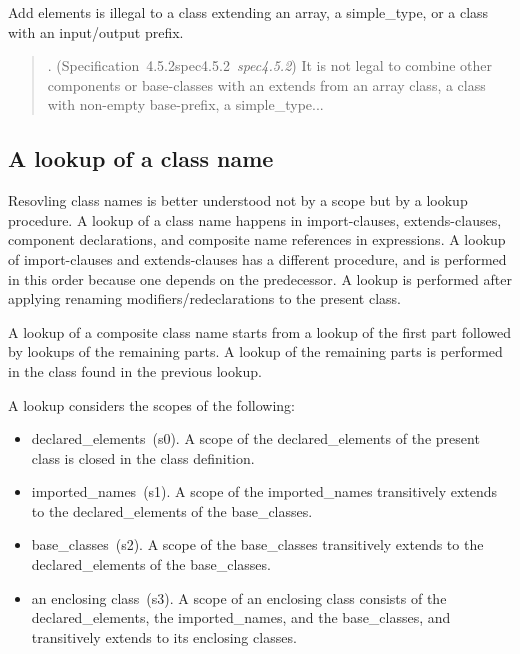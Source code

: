 \documentclass[10pt,b5paper]{article}
\newcounter{quoteno}
\def\quotelead{\refstepcounter{quoteno}{\bf{}Quote~\arabic{quoteno}}.}
\newenvironment{qquote}{\begin{quote}\quotelead}%
{\end{quote}\ignorespacesafterend}
\def\specrefx#1#2{Specification~#1\ifx\relax#2\relax{}\else~{\it{}#2}\fi}
\def\specref#1{\specrefx{#1}{\csname spec#1\endcsname}}
\begin{document}
Add elements is illegal to a class extending an array, a simple_type,
or a class with an input/output prefix.
\begin{qquote} (\specref{4.5.2}\/) It is not legal to combine other
components or base-classes with an extends from an array class, a
class with non-empty base-prefix, a simple_type...\end{qquote}


\subsection{A lookup of a class name}

Resovling class names is better understood not by a scope but by a
lookup procedure.  A lookup of a class name happens in import-clauses,
extends-clauses, component declarations, and composite name references
in expressions.  A lookup of import-clauses and extends-clauses has a
different procedure, and is performed in this order because one
depends on the predecessor.  A lookup is performed after applying
renaming modifiers/redeclarations to the present class.

A lookup of a composite class name starts from a lookup of the first
part followed by lookups of the remaining parts.  A lookup of the
remaining parts is performed in the class found in the previous
lookup.

A lookup considers the scopes of the following:
\begin{itemize}

\item declared_elements~(s0).  A scope of the declared_elements of the
present class is closed in the class definition.

\item imported_names~(s1).  A scope of the imported_names transitively
extends to the declared_elements of the base_classes.

\item base_classes~(s2).  A scope of the base_classes transitively
extends to the declared_elements of the base_classes.

\item an enclosing class~(s3).  A scope of an enclosing class consists
of the declared_elements, the imported_names, and the base_classes,
and transitively extends to its enclosing classes.

\end{itemize}
\end{document}
